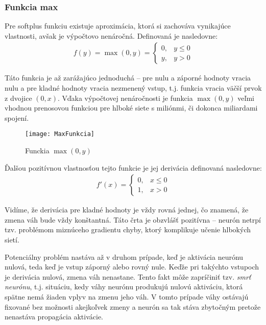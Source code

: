 \subsubsection{Funkcia max}

Pre softplus funkciu existuje aproximácia, ktorá si zachováva vynikajúce vlastnosti, avšak je výpočtovo nenáročná. Definovaná je nasledovne:
\begin{eqnarray}
f(y) = \max(0, y) =
\begin{cases}
0, & y \le 0 \\
y, & y > 0
\end{cases}
\end{eqnarray}

Táto funkcia je až zarážajúco jednoduchá -- pre nulu a záporné hodnoty vracia nulu a pre kladné hodnoty vracia nezmenený vstup, t.j. funkcia vracia väčší prvok z dvojice $(0, x)$. Vďaka výpočtovej nenáročnosti je funkcia $\max(0,y)$ veľmi vhodnou prenosovou funkciou pre hlboké siete s miliónmi, či dokonca miliardami spojení.

\begin{figure}[H]
  \centering
  \texttt{[image: MaxFunkcia]}
  \caption{Funckia $\max(0,y)$}
  \label{fig:MaxFunkcia}
\end{figure}

Ďalšou pozitívnou vlastnosťou tejto funkcie je jej derivácia definovaná nasledovne:
\begin{eqnarray}
f'(x) =
\begin{cases}
0, & x \le 0 \\
1, & x > 0
\end{cases}
\end{eqnarray}

Vidíme, že derivácia pre kladné hodnoty je vždy rovná jednej, čo znamená, že zmena váh bude vždy konštantná. Táto črta je obzvlášť pozitívna -- neurón netrpí tzv. problémom miznúceho gradientu chyby, ktorý komplikuje učenie hlbokých sietí. \autocite{Bengio1994}

Potenciálny problém nastáva až v druhom prípade, keď je aktivácia neurónu nulová, teda keď je vstup záporný alebo rovný nule. Keďže pri takýchto vstupoch je derivácia nulová, zmena váh nenastane. Tento fakt môže zapríčiniť tzv. \emph{smrť neurónu}, t.j. situáciu, kedy váhy neurónu produkujú nulovú aktiváciu, ktorá spätne nemá žiaden vplyv na zmenu jeho váh. V tomto prípade váhy ostávajú fixované bez možnosti akejkoľvek zmeny a neurón sa tak stáva zbytočným pretože nenastáva propagácia aktivácie. \autocite{Maas2013}

